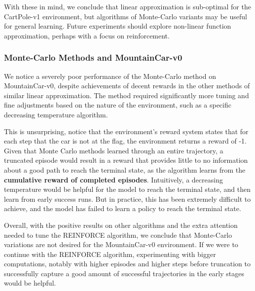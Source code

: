 \documentclass{article}
\begin{document}
With these in mind, we conclude that linear approximation is sub-optimal
for the CartPole-v1 environment, but algorithms of Monte-Carlo variants may be useful for general learning.
Future experiments should explore non-linear function approximation, perhaps with a focus on reinforcement.




\subsubsection{Monte-Carlo Methods and MountainCar-v0}
We notice a severely poor performance of the Monte-Carlo method on MountainCar-v0,
despite achievements of decent rewards in the other methods of similar linear approximation. The method required
significantly more tuning and fine adjustments based on the nature of the environment,
such as a specific decreasing temperature algorithm.




This is unsurprising, notice that the environment's reward system states that
for each step that the car is not at the flag, the environment returns a reward of -1.
Given that Monte Carlo methods learned through an entire trajectory, a truncated
episode would result in a reward that provides little to no information about a good path to
reach the terminal state, as the algorithm learns from the \textbf{cumulative reward of completed episodes}.
Intuitively, a decreasing temperature would be helpful for the model to reach the terminal state, and then learn from early success runs.
But in practice, this has been extremely difficult to achieve, and the model has failed to learn
a policy to reach the terminal state.




Overall, with the positive results on other algorithms and the extra attention needed to tune the
REINFORCE algorithm, we conclude that Monte-Carlo variations are not desired for the MountainCar-v0 environment.
If we were to continue with the REINFORCE algorithm, experimenting with bigger
computations, notably with higher episodes and higher steps before truncation to successfully capture
a good amount of successful trajectories in the early stages would be helpful.




\newpage


\end{document}
